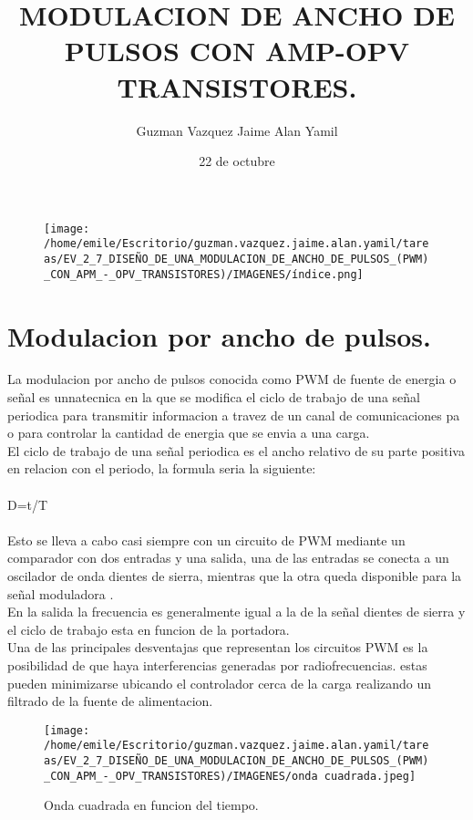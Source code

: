 \documentclass[12pt]{article}
\title{\textbf{MODULACION DE ANCHO DE PULSOS CON AMP-OPV TRANSISTORES.}}
\author{Guzman Vazquez Jaime Alan Yamil}
\date{22 de octubre}
\begin{document}
\begin{figure}[htp]
\centering
\texttt{[image: /home/emile/Escritorio/guzman.vazquez.jaime.alan.yamil/tareas/EV\_2\_7\_DISEÑO\_DE\_UNA\_MODULACION\_DE\_ANCHO\_DE\_PULSOS\_(PWM)\_CON\_APM\_-\_OPV\_TRANSISTORES)/IMAGENES/índice.png]}
\caption{}
\label{}
\end{figure}
\maketitle

\section{Modulacion por ancho de pulsos.}
La modulacion por ancho de pulsos conocida como PWM de fuente de energia o señal es unnatecnica en la que se modifica el ciclo de trabajo de una señal periodica para transmitir informacion a travez de un canal de comunicaciones pa o para controlar la cantidad de energia que se envia a una carga.\\
El ciclo de trabajo de una señal periodica es el ancho relativo de su parte positiva en relacion con el periodo, la formula seria la siguiente:\\\\
D=t/T\\
\\
Esto se lleva a cabo casi siempre con un circuito de PWM mediante un comparador  con dos entradas y una salida, una de las entradas se conecta a un oscilador de onda dientes de sierra, mientras que la otra queda disponible para la señal moduladora .\\
En la salida la frecuencia es generalmente igual  a la de la señal dientes de sierra y el ciclo de trabajo esta en funcion de la portadora. \\
Una de las principales desventajas que representan los circuitos PWM es la posibilidad de que haya interferencias generadas por radiofrecuencias. estas pueden minimizarse ubicando el controlador cerca de la carga realizando un filtrado de la fuente de alimentacion.\\

\begin{figure}[htp]
\centering
\texttt{[image: /home/emile/Escritorio/guzman.vazquez.jaime.alan.yamil/tareas/EV\_2\_7\_DISEÑO\_DE\_UNA\_MODULACION\_DE\_ANCHO\_DE\_PULSOS\_(PWM)\_CON\_APM\_-\_OPV\_TRANSISTORES)/IMAGENES/onda cuadrada.jpeg]}
\caption{Onda cuadrada en funcion del tiempo.}
\label{onda cuadradaa}
\end{figure}
\end{document}
